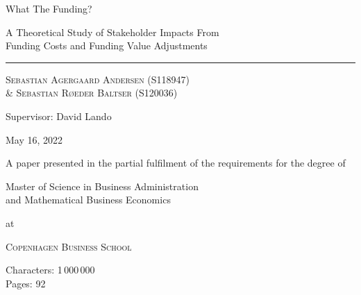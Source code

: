 \documentclass[main.tex]{subfiles}
\begin{document}
	\begin{titlepage}
		\centering
		\vspace{5cm}
		{\fontsize{48pt}{1pt}\selectfont What The Funding? \par}
		\vspace{0.5cm}
		{\Large A Theoretical Study of Stakeholder Impacts From \\ 
				Funding Costs and Funding Value Adjustments \par}
		\rule{\textwidth}{1px}\par
		{\scshape\large 
			Sebastian Agergaard Andersen {\scriptsize(S118947)} \\ %
			\& Sebastian Røeder Baltser {\scriptsize(S120036)} %
		\par}
		Supervisor: David Lando \\
		

		\scalebox{0.95}{%
			\begin{tikzpicture}[remember picture,overlay,shift={(current page.center)}]
				
			\end{tikzpicture}        
		}
		\vfill
		
		{\Large May 16, 2022 \par}		
		{A paper presented in the partial fulfilment
		of the requirements for the degree of \\}
		{\Large Master of Science in Business Administration \\
				and Mathematical Business Economics \par}
		at \par 
		{\scshape\LARGE Copenhagen Business School\par}
		\vspace{0.5cm}
		Characters: 1\,000\,000 \\
		Pages: 92
		
		\thispagestyle{empty}
	\end{titlepage}
\end{document}
